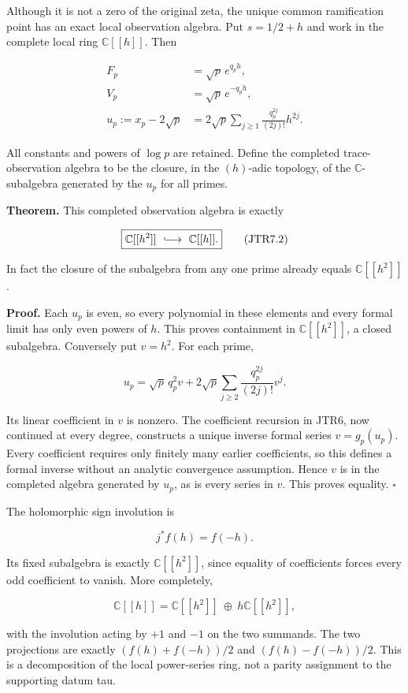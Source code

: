 \documentclass[
]{article}
\begin{document}
Although it is not a zero of the original zeta, the unique common
ramification point has an exact local observation algebra. Put
\(s=1/2+h\) and work in the complete local ring \(\mathbb C[[h]]\). Then

\[
\begin{aligned}
F_p&=\sqrt p\,e^{q_ph},\\
V_p&=\sqrt p\,e^{-q_ph},\\
u_p:=x_p-2\sqrt p
&=2\sqrt p\sum_{j\ge1}\frac{q_p^{2j}}{(2j)!}h^{2j}.
\end{aligned}
\tag{JTR7.1}
\]

All constants and powers of \(\log p\) are retained. Define the
completed trace-observation algebra to be the closure, in the
\((h)\)-adic topology, of the \(\mathbb C\)-subalgebra generated by the
\(u_p\) for all primes.

\textbf{Theorem.} This completed observation algebra is exactly

\[
\boxed{\mathbb C[[h^2]]\ \lhook\joinrel\longrightarrow\ \mathbb C[[h]].}
\tag{JTR7.2}
\]

In fact the closure of the subalgebra from any one prime already equals
\(\mathbb C[[h^2]]\).

\textbf{Proof.} Each \(u_p\) is even, so every polynomial in these
elements and every formal limit has only even powers of \(h\). This
proves containment in \(\mathbb C[[h^2]]\), a closed subalgebra.
Conversely put \(v=h^2\). For each prime,

\[
u_p=\sqrt p\,q_p^2v
+2\sqrt p\sum_{j\ge2}\frac{q_p^{2j}}{(2j)!}v^j.
\tag{JTR7.3}
\]

Its linear coefficient in \(v\) is nonzero. The coefficient recursion in
JTR6, now continued at every degree, constructs a unique inverse formal
series \(v=g_p(u_p)\). Every coefficient requires only finitely many
earlier coefficients, so this defines a formal inverse without an
analytic convergence assumption. Hence \(v\) is in the completed algebra
generated by \(u_p\), as is every series in \(v\). This proves equality.
\(\square\)

The holomorphic sign involution is

\[
j^*f(h)=f(-h).
\]

Its fixed subalgebra is exactly \(\mathbb C[[h^2]]\), since equality of
coefficients forces every odd coefficient to vanish. More completely,

\[
\mathbb C[[h]]
=\mathbb C[[h^2]]\ \oplus\ h\mathbb C[[h^2]],
\tag{JTR7.4}
\]

with the involution acting by \(+1\) and \(-1\) on the two summands. The
two projections are exactly \((f(h)+f(-h))/2\) and \((f(h)-f(-h))/2\).
This is a decomposition of the local power-series ring, not a parity
assignment to the supporting datum tau.
\end{document}
